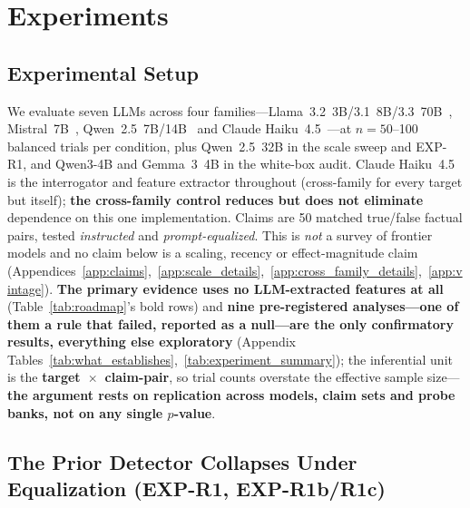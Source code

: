 \section{Experiments}
\label{sec:experiments}

\subsection{Experimental Setup}
\label{sec:setup}

We evaluate seven LLMs across four families---Llama~3.2~3B/3.1~8B/3.3~70B~\citep{meta2024llama3}, Mistral~7B~\citep{jiang2023mistral}, Qwen~2.5~7B/14B~\citep{qwen2025qwen25} and Claude Haiku~4.5~\citep{anthropic2025haiku45}---at $n=50$--100 balanced trials per condition, plus Qwen~2.5~32B in the scale sweep and EXP-R1, and Qwen3-4B and Gemma~3~4B in the white-box audit. Claude Haiku~4.5 is the interrogator and feature extractor throughout (cross-family for every target but itself); \textbf{the cross-family control reduces but does not eliminate} dependence on this one implementation. Claims are 50 matched true/false factual pairs, tested \emph{instructed} and \emph{prompt-equalized}. This is \emph{not} a survey of frontier models and no claim below is a scaling, recency or effect-magnitude claim (Appendices~\ref{app:claims},~\ref{app:scale_details},~\ref{app:cross_family_details},~\ref{app:vintage}). \textbf{The primary evidence uses no LLM-extracted features at all} (Table~\ref{tab:roadmap}'s bold rows) and \textbf{nine pre-registered analyses---one of them a rule that failed, reported as a null---are the only confirmatory results, everything else exploratory} (Appendix Tables~\ref{tab:what_establishes},~\ref{tab:experiment_summary}); the inferential unit is the \textbf{target~$\times$~claim-pair}, so trial counts overstate the effective sample size---\textbf{the argument rests on replication across models, claim sets and probe banks, not on any single $p$-value}.

\subsection{The Prior Detector Collapses Under Equalization (EXP-R1, EXP-R1b/R1c)}
\label{sec:r1_faithful}

